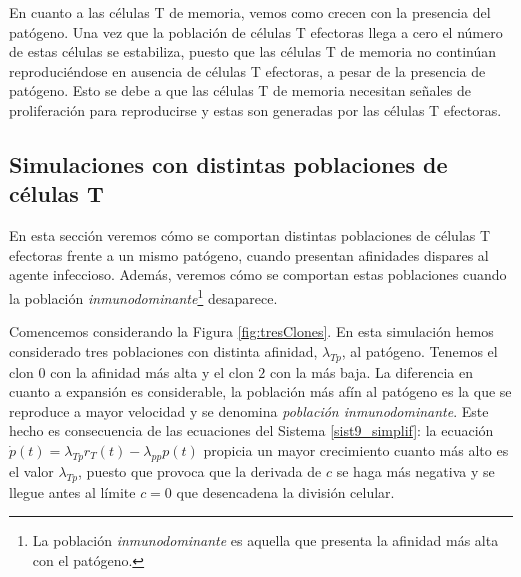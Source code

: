 En cuanto a las células T de memoria, vemos como crecen con la presencia del patógeno. Una vez que la población de células T efectoras llega a cero el número de estas células se estabiliza, puesto que las células T de memoria no continúan reproduciéndose en ausencia de células T efectoras, a pesar de la presencia de patógeno. Esto se debe a que las células T de memoria necesitan señales de proliferación para reproducirse y estas son generadas por las células T efectoras. 


\subsection{Simulaciones con distintas poblaciones de células T}
\label{sim:difPoblacionesT}

En esta sección veremos cómo se comportan distintas poblaciones de células T efectoras frente a un mismo patógeno, cuando presentan afinidades dispares al agente infeccioso. Además, veremos cómo se comportan estas poblaciones cuando la población \textit{inmunodominante}\footnote{La población \textit{inmunodominante} es aquella que presenta la afinidad más alta con el patógeno.} desaparece.

Comencemos considerando la Figura \ref{fig:tresClones}. En esta simulación hemos considerado tres poblaciones con distinta afinidad, $\lambda_{Tp}$, al patógeno. Tenemos el clon $0$ con la afinidad más alta y el clon $2$ con la más baja. La diferencia en cuanto a expansión es considerable, la población más afín al patógeno es la que se reproduce a mayor velocidad y se denomina \textit{población inmunodominante}. Este hecho es consecuencia de las ecuaciones del Sistema \ref{sist9_simplif}: la ecuación $\dot{p}(t) = \lambda_{Tp}r_{T}(t) - \lambda_{pp}p(t)$ propicia un mayor crecimiento cuanto más alto es el valor $\lambda_{Tp}$, puesto que provoca que la derivada de $c$ se haga más negativa y se llegue antes al límite $c = 0$ que desencadena la división celular.



